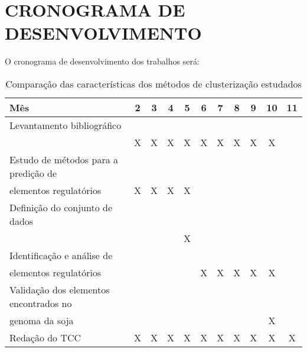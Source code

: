 \chapter{CRONOGRAMA DE DESENVOLVIMENTO}

O cronograma de desenvolvimento dos trabalhos será:
\begin{table}[h]
\caption{Comparação das características dos métodos de clusterização estudados}
  \begin{center}
    \begin{tabular}{|l|c|c|c|c|c|c|c|c|c|c|}
      \hline
        Mês & 2 & 3 & 4 & 5 & 6 & 7 & 8 & 9 & 10 & 11 \\
      \hline
        Levantamento bibliográfico & & & & & & & & & & \\
		     & X & X & X & X & X & X & X & X & X &  \\
      \hline
        Estudo de métodos para a predição de& & & & & & & & & & \\
        elementos regulatórios  & X & X & X & X & & & & & & \\
      \hline
        Definição do conjunto de dados & & & & & & & & & & \\
                                 & & & & X & & & & & & \\
      \hline
        Identificação e análise de& & & & & & & & & & \\
         elementos regulatórios  & & & & & X & X & X & X & X & \\
      \hline
        Validação dos elementos encontrados no & & & & & & & & & & \\
        genoma da soja & & & & & & &  &  & X & \\
      \hline
        Redação do TCC & X & X & X & X & X & X & X & X & X & X \\
      \hline
    \end{tabular}
    \label{tab:cronograma_trabalho}
  \end{center}
\end{table}